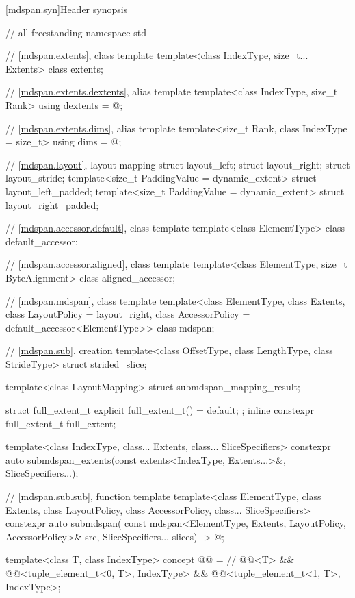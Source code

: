 [mdspan.syn]{Header  synopsis}

%
\begin{codeblock}
// all freestanding
namespace std {
  // \ref{mdspan.extents}, class template 
  template<class IndexType, size_t... Extents>
    class extents;

  // \ref{mdspan.extents.dextents}, alias template 
  template<class IndexType, size_t Rank>
    using dextents = @\seebelow@;

  // \ref{mdspan.extents.dims}, alias template 
  template<size_t Rank, class IndexType = size_t>
    using dims = @\seebelow@;

  // \ref{mdspan.layout}, layout mapping
  struct layout_left;
  struct layout_right;
  struct layout_stride;
  template<size_t PaddingValue = dynamic_extent>
    struct layout_left_padded;
  template<size_t PaddingValue = dynamic_extent>
    struct layout_right_padded;

  // \ref{mdspan.accessor.default}, class template 
  template<class ElementType>
    class default_accessor;

  // \ref{mdspan.accessor.aligned}, class template 
  template<class ElementType, size_t ByteAlignment>
    class aligned_accessor;

  // \ref{mdspan.mdspan}, class template 
  template<class ElementType, class Extents, class LayoutPolicy = layout_right,
           class AccessorPolicy = default_accessor<ElementType>>
    class mdspan;

  // \ref{mdspan.sub},  creation
  template<class OffsetType, class LengthType, class StrideType>
    struct strided_slice;

  template<class LayoutMapping>
    struct submdspan_mapping_result;

  struct full_extent_t { explicit full_extent_t() = default; };
  inline constexpr full_extent_t full_extent{};

  template<class IndexType, class... Extents, class... SliceSpecifiers>
    constexpr auto submdspan_extents(const extents<IndexType, Extents...>&, SliceSpecifiers...);

  // \ref{mdspan.sub.sub},  function template
  template<class ElementType, class Extents, class LayoutPolicy,
           class AccessorPolicy, class... SliceSpecifiers>
    constexpr auto submdspan(
      const mdspan<ElementType, Extents, LayoutPolicy, AccessorPolicy>& src,
      SliceSpecifiers... slices) -> @\seebelow@;

  template<class T, class IndexType>
    concept @@ =               // \expos
      @@<T> &&
      @@<tuple_element_t<0, T>, IndexType> &&
      @@<tuple_element_t<1, T>, IndexType>;
}
\end{codeblock}

